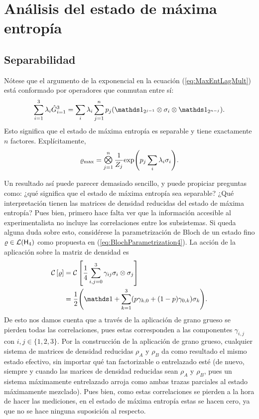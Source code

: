 \section{Análisis del estado de máxima entropía}

\subsection{Separabilidad}

Nótese que el argumento de la exponencial en la ecuación (\ref{eq:MaxEntLagMult}) está conformado por operadores que conmutan entre sí:
\begin{equation*}
    \sum_{i=1}^{3}\lambda_{i}\hat{G}_{i=1}^{3}=\sum_{i}\lambda_{i}\sum_{j=1}^{n}p_{j}(\Id_{2^{j-1}}\otimes\sigma_{i}\otimes\Id_{2^{n-j}}).
\end{equation*}
Esto significa que el estado de máxima entropía es separable y tiene exactamente $n$ factores. Explícitamente,
\begin{equation}\label{eq:MaxEntSeparable}
    \varrho_{\max}=\Motimes_{j=1}^{n}\frac{1}{Z_{j}}\text{exp}\qty(p_{j}\sum_{i}\lambda_{i}\sigma_{i}).
\end{equation}

Un resultado así puede parecer demasiado sencillo, y puede propiciar preguntas como: ¿qué significa que el estado de máxima entropía sea separable? ¿Qué interpretación tienen las matrices de densidad reducidas del estado de máxima entropía? Pues bien, primero hace falta ver que la información accesible al experimentalista no incluye las correlaciones entre los subsistemas. Si queda alguna duda sobre esto, considérese la parametrización de Bloch de un estado fino $\varrho\in\mathcal{L}({\sf H}_{4})$ como propuesta en (\ref{eq:BlochParametrization4}). La acción de la aplicación sobre la matriz de densidad es
\begin{align*}
    \CG{\varrho}&=\CG{\frac{1}{4}\sum_{i,j=0}^{3}\gamma_{ij}\pauli{i}\otimes \pauli{j}}\\
    &=\frac{1}{2}\qty(\Id+\sum_{k=1}^{3}(p\gamma_{k,0}+(1-p)\gamma_{0,k})\sigma_{k}).
\end{align*}
De esto nos damos cuenta que a través de la aplicación de grano grueso se pierden todas las correlaciones, pues estas corresponden a las componentes $\gamma_{i,j}$ con $i,j\in\{1,2,3\}$. Por la construcción de la aplicación de grano grueso, cualquier sistema de matrices de densidad reducidas $\rho_{A}$ y $\rho_{B}$ da como resultado el mismo estado efectivo, sin importar qué tan factorizable o entrelazado esté (de nuevo, siempre y cuando las marices de densidad reducidas sean $\rho_{A}$ y $\rho_{B}$, pues un sistema máximamente entrelazado arroja como ambas trazas parciales al estado máximamente mezclado). Pues bien, como estas correlaciones se pierden a la hora de hacer las mediciones, en el estado de máxima entropía estas se hacen cero, ya que no se hace ninguna suposición al respecto. 

